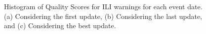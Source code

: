 \begin{figure}[tb!]



  \caption{\label{ref:ili_hist:compare} Histogram of Quality Scores for ILI warnings
  for each event date. (a) Considering the first update, (b) Considering the last update,
  and (c) Considering the best update.}
\end{figure}



